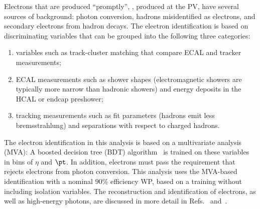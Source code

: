 Electrons that are produced ``promptly'', \ie, produced at the PV, have several sources of background: photon conversion, hadrons misidentified as electrons, and secondary electrons from hadron decays.
The electron identification is based on discriminating variables that can be grouped into the following three categories:
\begin{enumerate}
  \item variables such as track-cluster matching that compare ECAL and tracker measurements;
  \item ECAL measurements such as shower shapes (electromagnetic showers are typically more narrow than hadronic showers) and energy deposits in the HCAL or endcap preshower; %
  \item tracking measurements such as fit parameters (hadrons emit less bremsstrahlung) and separations with respect to charged hadrons.
\end{enumerate}
The electron identification in this analysis is based on a multivariate analysis (MVA): A boosted decision tree (BDT) algorithm~\cite{TMVA} is trained on these variables in bins of $\eta$ and $\pt$.
In addition, electrons must pass the requirement that rejects electrons from photon conversion.
This analysis uses the MVA-based identification with a nominal $90\%$ efficiency WP, based on a training without including isolation variables. %
The reconstruction and identification of electrons, as well as high-energy photons, are discussed in more detail in Refs.~\cite{CMS_electron} and~\cite{CMS_electron_2021}.


